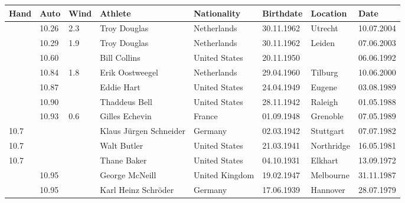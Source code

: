\documentclass{article}
\begin{document}
\begin{tabular}{llllllll}
\toprule
Hand & Auto & Wind & Athlete & Nationality & Birthdate & Location & Date \\
\midrule
 & 10.26 & 2.3 & Troy Douglas & Netherlands & 30.11.1962 & Utrecht & 10.07.2004 \\
 & 10.29 & 1.9 & Troy Douglas & Netherlands & 30.11.1962 & Leiden & 07.06.2003 \\
 & 10.60 &  & Bill Collins & United States & 20.11.1950 &  & 06.06.1992 \\
 & 10.84 & 1.8 & Erik Oostweegel & Netherlands & 29.04.1960 & Tilburg & 10.06.2000 \\
 & 10.87 &  & Eddie Hart & United States & 24.04.1949 & Eugene & 03.08.1989 \\
 & 10.90 &  & Thaddeus Bell & United States & 28.11.1942 & Raleigh & 01.05.1988 \\
 & 10.93 & 0.6 & Gilles Echevin & France & 01.09.1948 & Grenoble & 07.05.1989 \\
10.7 &  &  & Klaus Jürgen Schneider & Germany & 02.03.1942 & Stuttgart & 07.07.1982 \\
10.7 &  &  & Walt Butler & United States & 21.03.1941 & Northridge & 16.05.1981 \\
10.7 &  &  & Thane Baker & United States & 04.10.1931 & Elkhart & 13.09.1972 \\
 & 10.95 &  & George McNeill & United Kingdom & 19.02.1947 & Melbourne & 31.11.1987 \\
 & 10.95 &  & Karl Heinz Schröder & Germany & 17.06.1939 & Hannover & 28.07.1979 \\
\bottomrule
\end{tabular}
\end{document}
